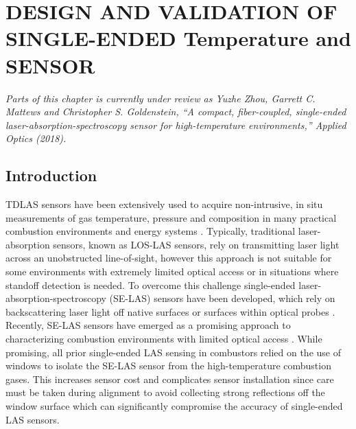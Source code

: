 \chapter{DESIGN AND VALIDATION OF SINGLE-ENDED Temperature and  SENSOR }

\vspace{3mm}

\textit{Parts of this chapter is currently under review as Yuzhe Zhou, Garrett C. Mattews and Christopher S. Goldenstein, ``A compact, fiber-coupled, single-ended laser-absorption-spectroscopy sensor for high-temperature environments,'' Applied Optics (2018).}

\section{Introduction}
TDLAS sensors have been extensively used to acquire non-intrusive, in situ measurements of gas temperature, pressure and composition in many practical combustion environments and energy systems \cite{Goldenstein2017, Ma2013, Caswell2013,Stritzke2015,Bürkle2018, Witzel2013,Makowiecki2017,rieker2009calibration,Li2011}. Typically, traditional laser-absorption sensors, known as LOS-LAS sensors, rely on transmitting laser light across an unobstructed line-of-sight, however this approach is not suitable for some environments with extremely limited optical access or in situations where standoff detection is needed. To overcome this challenge single-ended laser-absorption-spectroscopy (SE-LAS) sensors have been developed, which rely on backscattering laser light off native surfaces \cite{Dubinsky1998,Wainner2002,Wang2015,Goldenstein:16,Peng:16,Peng2018} or surfaces within optical probes \cite{RIEKER20073041,Rein:10,Chen2010,0957-0233-25-11-115501,GIRARD2017158}. Recently, SE-LAS sensors have emerged as a promising approach to characterizing combustion environments with limited optical access \cite{Goldenstein2017}. While promising, all prior single-ended LAS sensing in combustors relied on the use of windows to isolate the SE-LAS sensor from the high-temperature combustion gases. This increases sensor cost and complicates sensor installation since care must be taken during alignment to avoid collecting strong reflections off the window surface which can significantly compromise the accuracy of single-ended LAS sensors.

